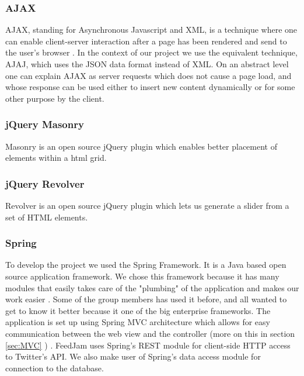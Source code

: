 \subsubsection{AJAX}%
AJAX, standing for Asynchronous Javascript and XML, is a technique where one can enable client-server interaction after a page has been rendered and send to the user's browser \cite{Garrett2005}. In the context of our project we use the equivalent technique, AJAJ, which uses the JSON data format instead of XML. On an abstract level one can explain AJAX as server requests which does not cause a page load, and whose response can be used either to insert new content dynamically or for some other purpose by the client.

\subsubsection{jQuery Masonry}
Masonry is an open source jQuery plugin which enables better placement of elements within a  html grid.

\subsubsection{jQuery Revolver}
Revolver is an open source jQuery plugin which lets us generate a slider from a set of HTML elements.


\subsubsection{Spring} %
To develop the project we used the Spring Framework. It is a Java based open source application framework. We chose this framework because it has many modules that easily takes care of the "plumbing" of the application and makes our work easier \citep{SpringSourcec}. Some of the group members has used it before, and all wanted to get to know it better because it one of the big enterprise frameworks. The application is set up using Spring MVC architecture which allows for easy communication between the web view and the controller (more on this in section \ref{sec:MVC} ) \citep{SpringSourcee}. FeedJam uses Spring's REST module for client-side HTTP access to Twitter's API. We also make user of Spring's data access module for connection to the database.